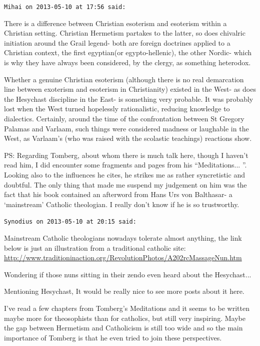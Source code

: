 \begin{footnotesize}
\begin{sffamily}
\hfill

\texttt{Mihai on 2013-05-10 at 17:56 said:}

There is a difference between Christian esoterism and esoterism within a Christian setting. Christian Hermetism partakes to the latter, so does chivalric initiation around the Grail legend- both are foreign doctrines applied to a Christian context, the first egyptian(or egypto-hellenic), the other Nordic- which is why they have always been considered, by the clergy, as something heterodox.

Whether a genuine Christian esoterism (although there is no real demarcation line between exoterism and esoterism in Christianity) existed in the West- as does the Hesychast discipline in the East- is something very probable. It was probably lost when the West turned hopelessly rationalistic, reducing knowledge to dialectics. Certainly, around the time of the confrontation between St Gregory Palamas and Varlaam, such things were considered madness or laughable in the West, as Varlaam's (who was raised with the scolastic teachings) reactions show.

PS: Regarding Tomberg, about whom there is much talk here, though I haven't read him, I did encounter some fragments and pages from his ``Meditations... ''. Looking also to the influences he cites, he strikes me as rather syncretistic and doubtful. The only thing that made me suspend my judgement on him was the fact that his book contained an afterword from Hans Urs von Balthasar- a `mainstream' Catholic theologian. I really don't know if he is so trustworthy.

\hfill

\texttt{Synodius on 2013-05-10 at 20:15 said:}

Mainstream Catholic theologians nowadays tolerate almost anything, the link below is just an illustration from a traditional catholic site: \url{http://www.traditioninaction.org/RevolutionPhotos/A202rcMassageNun.htm}

Wondering if those nuns sitting in their zendo even heard about the Hesychast... 

Mentioning Hesychast, It would be really nice to see more posts about it here.

I've read a few chapters from Tomberg's Meditations and it seems to be written maybe more for theosophists than for catholics, but still very inspiring. Maybe the gap between Hermetism and Catholicism is still too wide and so the main importance of Tomberg is that he even tried to join these perspectives.


\end{sffamily}
\end{footnotesize}
